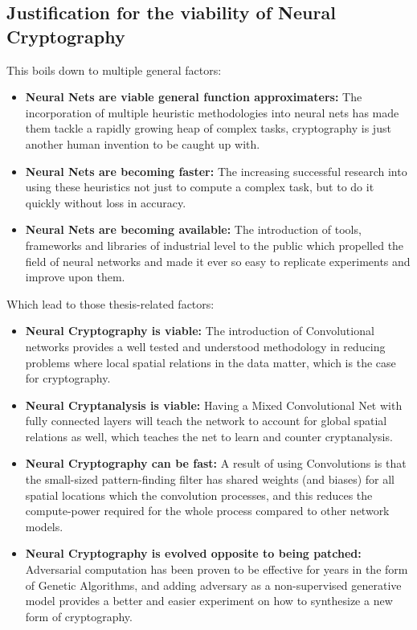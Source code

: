 \documentclass[a4paper, 12pt]{report}
\begin{document}
\subsection{\textbf{Justification for the viability of Neural Cryptography}}
This boils down to multiple general factors:
\begin{itemize}[nosep]
	\item \textbf{Neural Nets are viable general function approximaters:} The incorporation of multiple heuristic methodologies into neural nets has made them tackle a rapidly growing heap of complex tasks, cryptography is just another human invention to be caught up with.
	\item \textbf{Neural Nets are becoming faster:} The increasing successful research into using these heuristics not just to compute a complex task, but to do it quickly without loss in accuracy.
	\item \textbf{Neural Nets are becoming available:} The introduction of tools, frameworks and libraries of industrial level to the public which propelled the field of neural networks and made it ever so easy to replicate experiments and improve upon them.
\end{itemize}
Which lead to those thesis-related factors:
\begin{itemize}[nosep]
	\item \textbf{Neural Cryptography is viable:} The introduction of Convolutional networks provides a well tested and understood methodology in reducing problems where local spatial relations in the data matter, which is the case for cryptography.
	\item \textbf{Neural Cryptanalysis is viable:} Having a Mixed Convolutional Net with fully connected layers will teach the network to account for global spatial relations as well, which teaches the net to learn and counter cryptanalysis.
	\item \textbf{Neural Cryptography can be fast:} A result of using Convolutions is that the small-sized pattern-finding filter has shared weights (and biases) for all spatial locations which the convolution processes, and this reduces the compute-power required for the whole process compared to other network models.
	\item \textbf{Neural Cryptography is evolved opposite to being patched:} Adversarial computation has been proven to be effective for years in the form of Genetic Algorithms, and adding adversary as a non-supervised generative model provides a better and easier experiment on how to synthesize a new form of cryptography.
\end{itemize}
\newpage
\end{document}
